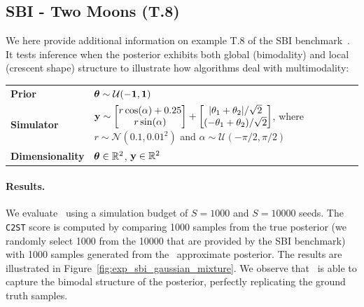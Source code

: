\subsection{SBI - Two Moons (T.8)}

We here provide additional information on example T.8 of the SBI benchmark~\cite{lueckmann2021benchmarking}.
It tests inference when the posterior exhibits both global (bimodality) and local (crescent shape) structure to illustrate how algorithms deal with multimodality:

\begin{tabular}{@{}ll@{}}
  \textbf{Prior} & $\boldsymbol{\theta} \sim \mathcal{U}(-\mathbf{1}, \mathbf{1})$ \\ [5pt]
  \textbf{Simulator} & $\mathbf{y} \sim \begin{bmatrix} 
    r \cos(\alpha) + 0.25 \\ 
    r \sin(\alpha)
  \end{bmatrix} + \begin{bmatrix} 
    |\theta_1 + \theta_2|/\sqrt{2} \\ 
    (-\theta_1 + \theta_2)/\sqrt{2}
  \end{bmatrix}$, where $r \sim \mathcal{N}(0.1, 0.01^2)$ and $\alpha \sim \mathcal{U}(-\pi/2, \pi/2)$ \\ [10pt]
  \textbf{Dimensionality} & $\boldsymbol{\theta} \in \mathbb{R}^{2}$, $\mathbf{y} \in \mathbb{R}^{2}$ \\ [5pt]
\end{tabular}

\paragraph{Results.}

We evaluate \rromc~using a simulation budget of $S=1000$ and $S=10000$ seeds.
The \texttt{C2ST} score is computed by comparing 1000 samples from the true posterior (we randomly select 1000 from the 10000 that are provided by the SBI benchmark)
with 1000 samples generated from the \rromc~approximate posterior.
The results are illustrated in Figure~\ref{fig:exp_sbi_gaussian_mixture}.
We observe that \rromc~is able to capture the bimodal structure of the posterior, perfectly replicating the ground truth samples.

